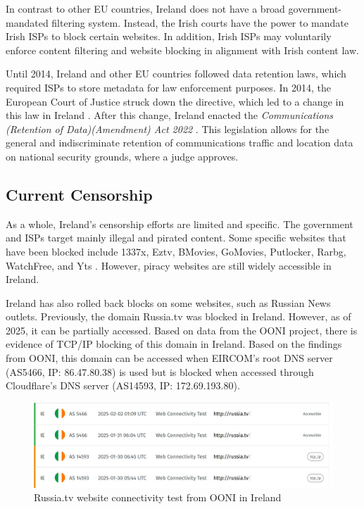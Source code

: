 In contrast to other EU countries, Ireland does not have a broad government-mandated filtering system. Instead, the Irish courts have the power to mandate Irish ISPs to block certain websites. In addition, Irish ISPs may voluntarily enforce content filtering and website blocking in alignment with Irish content law.

Until 2014, Ireland and other EU countries followed data retention laws, which required ISPs to store metadata for law enforcement purposes. In 2014, the European Court of Justice struck down the directive, which led to a change in this law in Ireland \cite{DataRetentionInvalid2014}. After this change, Ireland enacted the \textit{Communications (Retention of Data)(Amendment) Act 2022} \cite{irishlegalDataRetention}. This legislation allows for the general and indiscriminate retention of communications traffic and location data on national security grounds, where a judge approves.

\subsection{Current Censorship}

As a whole, Ireland's censorship efforts are limited and specific. The government and ISPs target mainly illegal and pirated content. Some specific websites that have been blocked include 1337x, Eztv, BMovies, GoMovies, Putlocker, Rarbg, WatchFree, and Yts \cite{siliconrepublicMovieIndustry}. However, piracy websites are still widely accessible in Ireland.

Ireland has also rolled back blocks on some websites, such as Russian News outlets. Previously, the domain Russia.tv was blocked in Ireland. However, as of 2025, it can be partially accessed. Based on data from the OONI project, there is evidence of TCP/IP blocking of this domain in Ireland. Based on the findings from OONI, this domain can be accessed when EIRCOM's root DNS server (AS5466, IP: 86.47.80.38) is used but is blocked when accessed through Cloudflare's DNS server (AS14593, IP: 172.69.193.80).


\begin{figure}[H]
    \centering
    \includegraphics[width=\textwidth]{Griff/TCD SCSS CAPSTONE/Literature Review/RussiaTV search OONI.jpg}
    \caption{Russia.tv website connectivity test from OONI in Ireland}
    \label{fig:RussiaTV-OONI-TEST-IRELAND}
\end{figure}

